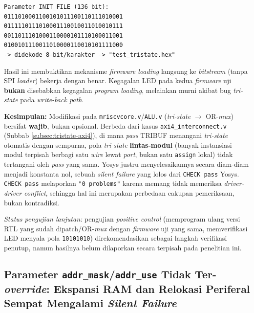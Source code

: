 \begin{verbatim}
Parameter INIT_FILE (136 bit):
0111010001100101011100110111010001
0111110111010001110010011010010111
0011011101000110000101110100011001
0100101110011010000110010101111000
-> didekode 8-bit/karakter -> "test_tristate.hex"
\end{verbatim}

Hasil ini membuktikan mekanisme \textit{firmware loading} langsung ke \textit{bitstream} (tanpa SPI \textit{loader}) bekerja dengan benar. Kegagalan LED pada kedua \textit{firmware} uji \textbf{bukan} disebabkan kegagalan \textit{program loading}, melainkan murni akibat bug \textit{tri-state} pada \textit{write-back path}.

\textbf{Kesimpulan:} Modifikasi pada \texttt{mriscvcore.v}/\texttt{ALU.v} (\textit{tri-state} $\rightarrow$ OR-\textit{mux}) bersifat \textbf{wajib}, bukan opsional. Berbeda dari kasus \texttt{axi4\_interconnect.v} (Subbab \ref{subsec:tristate-axi4}), di mana \textit{pass} TRIBUF menangani \textit{tri-state} otomatis dengan sempurna, pola \textit{tri-state} \textbf{lintas-modul} (banyak instansiasi modul terpisah berbagi satu \textit{wire} lewat \textit{port}, bukan satu \texttt{assign} lokal) tidak tertangani oleh \textit{pass} yang sama. Yosys justru menyelesaikannya secara diam-diam menjadi konstanta nol, sebuah \textit{silent failure} yang lolos dari \texttt{CHECK pass} Yosys. \texttt{CHECK pass} melaporkan \texttt{"0 problems"} karena memang tidak memeriksa \textit{driver-driver conflict}, sehingga hal ini merupakan perbedaan cakupan pemeriksaan, bukan kontradiksi.

\textit{Status pengujian lanjutan:} pengujian \textit{positive control} (memprogram ulang versi RTL yang sudah dipatch/OR-\textit{mux} dengan \textit{firmware} uji yang sama, memverifikasi LED menyala pola \texttt{10101010}) direkomendasikan sebagai langkah verifikasi penutup, namun hasilnya belum dilaporkan secara terpisah pada penelitian ini.

\subsection{Parameter \texttt{addr\_mask}/\texttt{addr\_use} Tidak Ter-\textit{override}: Ekspansi RAM dan Relokasi Periferal Sempat Mengalami \textit{Silent Failure}}
\label{subsec:addr-mask}

